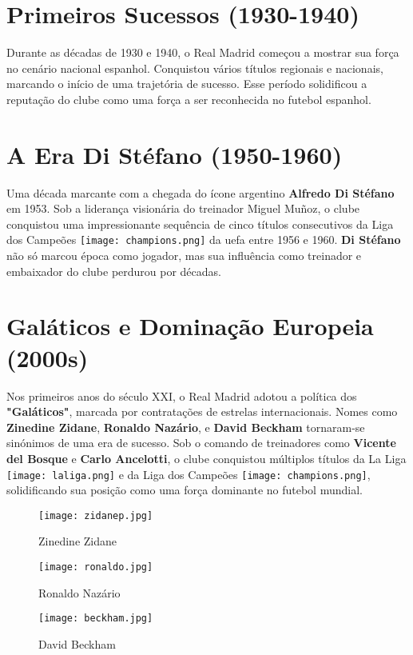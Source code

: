 \documentclass{report}
\begin{document}
\section{Primeiros Sucessos (1930-1940)}
Durante as décadas de 1930 e 1940, o Real Madrid começou a mostrar sua força no cenário nacional espanhol. Conquistou vários títulos regionais e nacionais, marcando o início de uma trajetória de sucesso. Esse período solidificou a reputação do clube como uma força a ser reconhecida no futebol espanhol.


\section{A Era Di Stéfano (1950-1960)}
Uma década marcante com a chegada do ícone argentino \textbf{Alfredo Di Stéfano} em 1953. Sob a liderança visionária do treinador Miguel Muñoz, o clube conquistou uma impressionante sequência de cinco títulos consecutivos da Liga dos Campeões \texttt{[image: champions.png]} da \acs{uefa} entre 1956 e 1960. \textbf{Di Stéfano} não só marcou época como jogador, mas sua influência como treinador e embaixador do clube perdurou por décadas.

\section{Galáticos e Dominação Europeia (2000s)}

Nos primeiros anos do século XXI, o Real Madrid adotou a política dos \textbf{"Galáticos"}, marcada por contratações de estrelas internacionais. Nomes como \textbf{Zinedine Zidane}, \textbf{Ronaldo Nazário}, e \textbf{David Beckham} tornaram-se sinónimos de uma era de sucesso. Sob o comando de treinadores como \textbf{Vicente del Bosque} e \textbf{Carlo Ancelotti}, o clube conquistou múltiplos títulos da La Liga \texttt{[image: laliga.png]} e da Liga dos Campeões \texttt{[image: champions.png]}, solidificando sua posição como uma força dominante no futebol mundial.
\begin{figure}[h]
    \centering
    \begin{minipage}{.3\textwidth}
        \centering
        \texttt{[image: zidanep.jpg]}
        \caption{Zinedine Zidane}\cite{realmadrid-Imagens}
        \label{fig:zidanep}
    \end{minipage}
    \hfill
    \begin{minipage}{.3\textwidth}
        \centering
        \texttt{[image: ronaldo.jpg]}
        \caption{Ronaldo Nazário}
        \label{fig:ronaldo}
    \end{minipage}
    \hfill
    \begin{minipage}{.3\textwidth}
        \centering
        \texttt{[image: beckham.jpg]}
        \caption{David Beckham}
        \label{fig:beckham}
    \end{minipage}
\end{figure}
\end{document}
